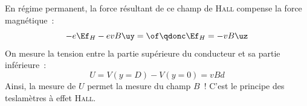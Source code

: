 \documentclass[../../main/main.tex]{subfiles}
\begin{document}
\begin{itemize}[label=$\diamond$]
\begin{center}
		\label{fig:hall}
	\end{center}
	En régime permanent, la force résultant de ce champ de \textsc{Hall}
	compense la force magnétique~:
	\[
		-e\Ef_H -evB\uy = \of
		\qdonc
		\Ef_H = -vB\uz
	\]
	On mesure la tension entre la partie supérieure du conducteur et sa
	partie inférieure~:
	\[U = V(y=D) - V(y=0) = vBd\]
	Ainsi, la mesure de $U$ permet la mesure du champ $B$~! C'est le
	principe des teslamètres à effet \textsc{Hall}.
\end{itemize}
\end{document}
